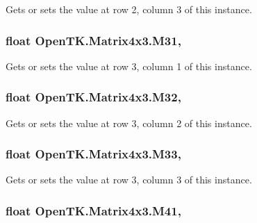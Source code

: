 Gets or sets the value at row 2, column 3 of this instance. 

\hypertarget{struct_open_t_k_1_1_matrix4x3_afe9d19f5cb53a6db44d794f4643c7643}{
\subsubsection[{M31}]{\setlength{\rightskip}{0pt plus 5cm}float Open\-T\-K.\-Matrix4x3.\-M31\hspace{0.3cm}{\ttfamily [get]}, {\ttfamily [set]}}}\label{struct_open_t_k_1_1_matrix4x3_afe9d19f5cb53a6db44d794f4643c7643}


Gets or sets the value at row 3, column 1 of this instance. 

\hypertarget{struct_open_t_k_1_1_matrix4x3_ab765c24562ac0b0455a1e8e4d44b8907}{
\subsubsection[{M32}]{\setlength{\rightskip}{0pt plus 5cm}float Open\-T\-K.\-Matrix4x3.\-M32\hspace{0.3cm}{\ttfamily [get]}, {\ttfamily [set]}}}\label{struct_open_t_k_1_1_matrix4x3_ab765c24562ac0b0455a1e8e4d44b8907}


Gets or sets the value at row 3, column 2 of this instance. 

\hypertarget{struct_open_t_k_1_1_matrix4x3_abd2d40897d9bd592b7dd6d17f9a75b4a}{
\subsubsection[{M33}]{\setlength{\rightskip}{0pt plus 5cm}float Open\-T\-K.\-Matrix4x3.\-M33\hspace{0.3cm}{\ttfamily [get]}, {\ttfamily [set]}}}\label{struct_open_t_k_1_1_matrix4x3_abd2d40897d9bd592b7dd6d17f9a75b4a}


Gets or sets the value at row 3, column 3 of this instance. 

\hypertarget{struct_open_t_k_1_1_matrix4x3_a97b7c88adc7bfa3d243873f42a2a9ea9}{
\subsubsection[{M41}]{\setlength{\rightskip}{0pt plus 5cm}float Open\-T\-K.\-Matrix4x3.\-M41\hspace{0.3cm}{\ttfamily [get]}, {\ttfamily [set]}}}\label{struct_open_t_k_1_1_matrix4x3_a97b7c88adc7bfa3d243873f42a2a9ea9}


